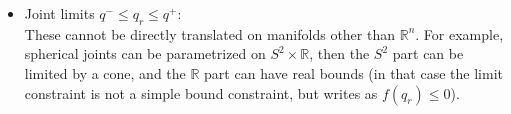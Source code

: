 \begin{itemize}
\item Joint limits ${q^-} \leq q_r \leq {q^+}$:\\
These cannot be directly translated on manifolds other than $\mathbb{R}^n$.
For example, spherical joints can be parametrized on $S^2 \times \mathbb{R}$, then the $S^2$ part can be limited by a cone, and the $\mathbb{R}$ part can have real bounds (in that case the limit constraint is not a simple bound constraint, but writes as $f(q_r)\leq 0$).


\end{itemize}
